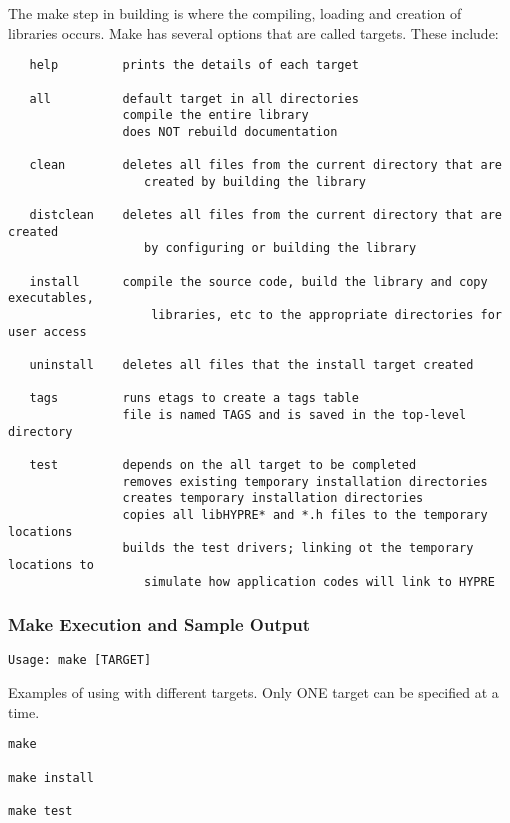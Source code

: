 The make step in building \hypre{} is where the compiling, loading and creation 
of libraries occurs.  Make has several options that are called targets.  These include:
\begin{verbatim}
   help         prints the details of each target

   all          default target in all directories
                compile the entire library
                does NOT rebuild documentation

   clean        deletes all files from the current directory that are 
                   created by building the library

   distclean    deletes all files from the current directory that are created
                   by configuring or building the library

   install      compile the source code, build the library and copy executables,
                    libraries, etc to the appropriate directories for user access

   uninstall    deletes all files that the install target created

   tags         runs etags to create a tags table
                file is named TAGS and is saved in the top-level directory

   test         depends on the all target to be completed
                removes existing temporary installation directories
                creates temporary installation directories
                copies all libHYPRE* and *.h files to the temporary locations
                builds the test drivers; linking ot the temporary locations to
                   simulate how application codes will link to HYPRE
\end{verbatim}


\subsubsection{Make Execution and Sample Output}
\label{Make Execution and Sample Output}

\begin{verbatim}
Usage: make [TARGET]
\end{verbatim}

Examples of using  with different targets.  Only ONE target can be specified at a time. 
\begin{verbatim}
make

make install

make test
\end{verbatim}

